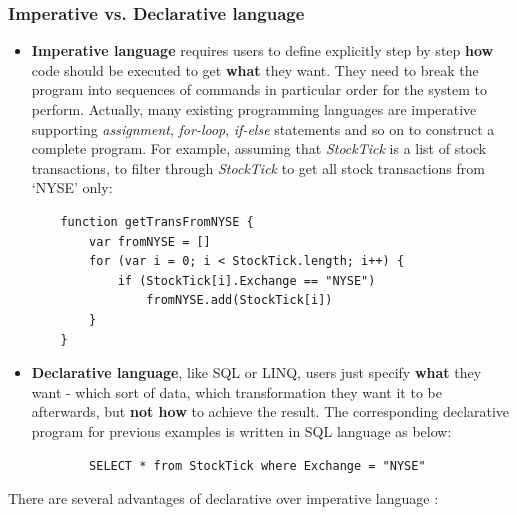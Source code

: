 \subsubsection*{Imperative vs. Declarative language}
\begin{itemize}
	\item \textbf{Imperative language} requires users to define explicitly step by step \textbf{how} code should be executed to get \textbf{what} they want. They need to break the program into sequences of commands in particular order for the system to perform. Actually, many existing programming languages are imperative supporting \textit{assignment}, \textit{for-loop}, \textit{if-else} statements and so on to construct a complete program. For example, assuming that \textit{StockTick} is a  list of stock transactions,  to filter through \textit{StockTick} to get all stock transactions from `NYSE' only: 
\begin{lstlisting}
	function getTransFromNYSE {
		var fromNYSE = []
		for (var i = 0; i < StockTick.length; i++) {
			if (StockTick[i].Exchange == "NYSE")
				fromNYSE.add(StockTick[i])
		}
	}
\end{lstlisting}
	\item \textbf{Declarative language}, like SQL or LINQ, users just specify \textbf{what} they want - which sort of data, which transformation they want it to be afterwards, but \textbf{not how} to achieve the result. The corresponding declarative program for previous examples is written in SQL language as below:
	\begin{verbatim}
		SELECT * from StockTick where Exchange = "NYSE"
	\end{verbatim}
\end{itemize}

There are several advantages of declarative over imperative language \citep{Martin:2014}:

